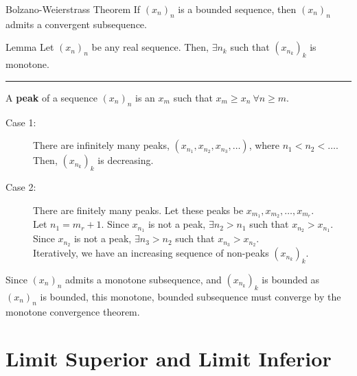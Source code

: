 \documentclass[10pt]{extarticle}
\begin{document}
  \begin{problem}{Bolzano-Weierstrass Theorem}
    If $(x_n)_n$ is a bounded sequence, then $(x_n)_n$ admits a convergent subsequence.
    \begin{problem}{Lemma}
      Let $(x_n)_n$ be any real sequence. Then, $\exists n_k$ such that $(x_{n_k})_k$ is monotone.\\
      \vspace{4pt}
      \rule{\textwidth}{0.4pt}
      \vspace{4pt}
      A \textbf{peak} of a sequence $(x_n)_n$ is an $x_m$ such that $x_m \geq x_n~\forall n\geq m$.
      \tcblower
      \begin{description}
        \item[Case 1:] There are infinitely many peaks, $(x_{n_1}, x_{n_2},x_{n_3},\dots)$, where $n_1 < n_2 < \dots$. Then, $\left(x_{n_k}\right)_k$ is decreasing.
        \item[Case 2:] There are finitely many peaks. Let these peaks be $x_{m_1},x_{m_2},\dots,x_{m_r}$.\\

          Let $n_1 = m_r + 1$. Since $x_{n_1}$ is not a peak, $\exists n_2 > n_1$ such that $x_{n_2} > x_{n_1}$. Since $x_{n_2}$ is not a peak, $\exists n_3 > n_2$ such that $x_{n_3} > x_{n_2}$.\\

          Iteratively, we have an increasing sequence of non-peaks $(x_{n_k})_k$.
      \end{description}
    \end{problem}
    \tcblower
    Since $(x_n)_n$ admits a monotone subsequence, and $(x_{n_k})_k$ is bounded as $(x_n)_n$ is bounded, this monotone, bounded subsequence must converge by the monotone convergence theorem.
  \end{problem}
  \section*{Limit Superior and Limit Inferior}%
  
\end{document}
